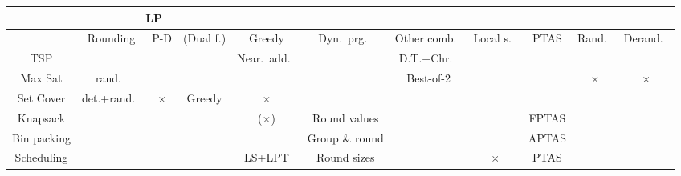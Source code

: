 \documentclass{article}
\newcommand{\x}{\ensuremath{\times}}
\begin{document}
\begin{landscape}
\hspace*{-3cm}
\begin{tabular}{|c||c|c|c|c|c|c|c|c|c|c|}
  \hline
             & \multicolumn{3}{|c|}{LP}       &              &                &                    &           &       &        & \\
  \hline
             & Rounding    & P-D   & (Dual f.) & Greedy       & Dyn.\ prg.\    & Other comb.\       & Local s.\ & PTAS  & Rand.\ & Derand.\ \\
  \hline\hline
  TSP        &             &       &          & Near.\ add.\ &                & D.T.+Chr.\    &           &       &        &\\
  \hline
  Max Sat    & rand.\      &       &          &              &                & Best-of-2          &           &       & \x     & \x\\
  \hline
  Set Cover  & det.+rand.\ & \x    & Greedy   & \x           &                &                    &           &       &        & \\
  \hline
  Knapsack   &             &       &          & (\x)         & Round values   &                    &           & FPTAS &        &\\
  \hline
Bin packing  &             &       &          &              & Group \& round &                    &           & APTAS &        &\\
\hline
 Scheduling  &             &       &          & LS+LPT       & Round sizes    &                    & \x        & PTAS  &        &\\
  \hline
\end{tabular}
\end{landscape}
\end{document}
